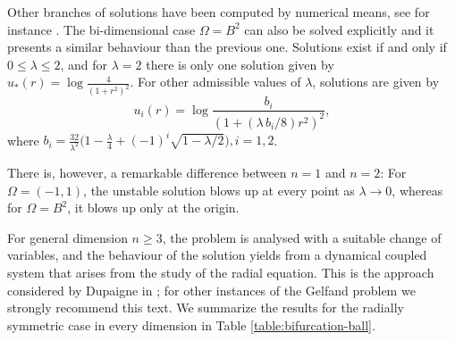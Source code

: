 Other branches of solutions have been computed by numerical means, see for
instance \cite{new-solutions}.  The bi-dimensional case $\Omega=B^2$ can also
be solved explicitly and it presents a similar behaviour than the previous one.
Solutions exist if and only if $0\leq \lambda \leq 2$, and for $\lambda=2$
there is only one solution given by $u_\ast(r)=\log\frac{4}{(1+r^2)^2}$.
For other admissible values of $\lambda$, solutions are given by
$$
u_i(r)=\log\frac{b_i}{(1+(\lambda\, b_i/8)r^2)^2},
$$
where
$b_i=\frac{32}{\lambda^2}\big(1-\frac{\lambda}{4}+(-1)^i\sqrt{1-\lambda/2}\big),
i=1,2$.
\medskip

There is, however, a remarkable difference between $n=1$ and $n=2$: For
$\Omega=(-1,1)$, the unstable solution blows up at every point as $\lambda\to
0$, whereas for $\Omega=B^2$, it blows up only at the origin.
\medskip

For general dimension $n\geq 3$, the problem is analysed with a suitable change
of variables, and the behaviour of the solution yields from a dynamical coupled
system that arises from the study of the radial equation. This is the approach
considered by Dupaigne in \cite{stable-solutions-elliptic}; for other
instances of the Gelfand problem we strongly recommend this text. We summarize
the results for the radially symmetric case in every dimension in Table \ref{table:bifurcation-ball}.


